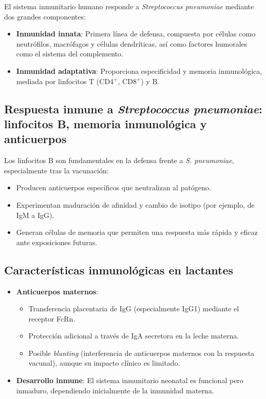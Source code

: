 El sistema inmunitario humano responde a \textit{Streptococcus pneumoniae} mediante dos grandes componentes:

\begin{itemize}
    \item \textbf{Inmunidad innata}: Primera línea de defensa, compuesta por células como neutrófilos, macrófagos y células dendríticas, así como factores humorales como el sistema del complemento.
    \item \textbf{Inmunidad adaptativa}: Proporciona especificidad y memoria inmunológica, mediada por linfocitos T (CD4$^+$, CD8$^+$) y B.
\end{itemize}

\subsection{Respuesta inmune a \textit{Streptococcus pneumoniae}: linfocitos B, memoria inmunológica y anticuerpos}

Los linfocitos B son fundamentales en la defensa frente a \textit{S. pneumoniae}, especialmente tras la vacunación:
\begin{itemize}
    \item Producen anticuerpos específicos que neutralizan al patógeno.
    \item Experimentan maduración de afinidad y cambio de isotipo (por ejemplo, de IgM a IgG).
    \item Generan células de memoria que permiten una respuesta más rápida y eficaz ante exposiciones futuras.
\end{itemize}

\subsection{Características inmunológicas en lactantes}
\begin{itemize}
    \item \textbf{Anticuerpos maternos}: 
    \begin{itemize}
        \item Transferencia placentaria de IgG (especialmente IgG1) mediante el receptor FcRn.
        \item Protección adicional a través de IgA secretora en la leche materna.
        \item Posible \textit{blunting} (interferencia de anticuerpos maternos con la respuesta vacunal), aunque su impacto clínico es limitado.\cite{AEP2023Blunting}
    \end{itemize}
    \item \textbf{Desarrollo inmune}: El sistema inmunitario neonatal es funcional pero inmaduro, dependiendo inicialmente de la inmunidad materna.
\end{itemize}

